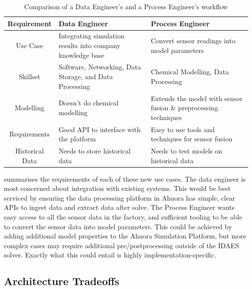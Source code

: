 \begin{table}[ht]
    \centering
    \caption{Comparison of a Data Engineer's and a Process Engineer's workflow}
    \begin{tabular}{|c|p{}|p{}|}
        \hline
        \textbf{Requirement} & \textbf{Data Engineer} & \textbf{Process Engineer} \\
        \hline
        Use Case & Integrating simulation results into company knowledge base & Convert sensor readings into model parameters \\
        \hline
        Skillset & Software, Networking, Data Storage, and Data Processing  & Chemical Modelling, Data Processing \\
        \hline
        Modelling & Doesn't do chemical modelling & Extends the model with sensor fusion \& preprocessing techniques\\
        \hline
        Requirements & Good API to interface with the platform & Easy to use tools and techniques for sensor fusion \\
        \hline
        Historical Data & Needs to store historical data & Needs to test models on historical data \\
        \hline
    \end{tabular}
    \label{tab:morerequirements}
\end{table}


 summarises the requirements of each of these new use cases. The data engineer is most concerned about integration with existing systems. This would be best serviced by ensuring the data processing platform in Ahuora has simple, clear APIs to ingest data and extract data after solve. The Process Engineer wants easy access to all the sensor data in the factory, and sufficient tooling to be able to convert the sensor data into model parameters. This could be achieved by adding additional model properties to the Ahuora Simulation Platform, but more complex cases may require additional pre/postprocessing outside of the IDAES solver. Exactly what this could entail is highly implementation-specific.

\subsection{Architecture Tradeoffs}

